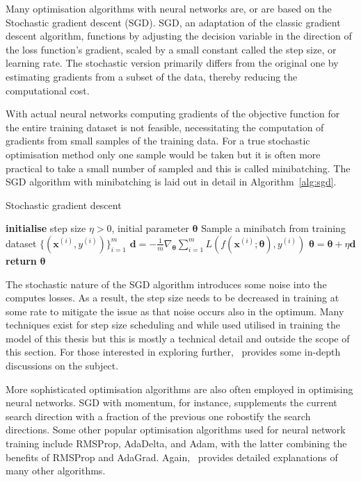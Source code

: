 Many optimisation algorithms with neural networks are, or are based on the Stochastic gradient descent (SGD).
SGD, an adaptation of the classic gradient descent algorithm, functions by adjusting the decision variable in the direction of the loss function's gradient, scaled by a small constant called the step size, or learning rate.
The stochastic version primarily differs from the original one by estimating gradients from a subset of the data, thereby reducing the computational cost.

With actual neural networks computing gradients of the objective function for the entire training dataset is not feasible, necessitating the computation of gradients from small samples of the training data.
For a true stochastic optimisation method only one sample would be taken but it is often more practical to take a small number of sampled and this is called minibatching.
The SGD algorithm with minibatching is laid out in detail in Algorithm~\ref{alg:sgd}.

\begin{algorithm}[H]
    \caption{Stochastic gradient descent}
    \label{alg:sgd}
    \begin{algorithmic}[1]
        \State\textbf{initialise} step size $\eta > 0$, initial parameter $\bm{\theta}$
         
        \State Sample a minibatch from training dataset $\{ (\bm{x}^{(i)}, y^{(i)}) \}_{i=1}^{m}$
        \State $\bm{d} = -\frac{1}{m} \nabla_{\bm{\theta}} \sum_{i=1}^{m} L(f(\bm{x}^{(i)}; \bm{\theta}), y^{(i)})$ 
        \State $\bm{\theta} = \bm{\theta} + \eta \bm{d}$ 
        \EndWhile
        \State\textbf{return} $\bm{\theta}$
    \end{algorithmic}
\end{algorithm}

The stochastic nature of the SGD algorithm introduces some noise into the computes losses.
As a result, the step size needs to be decreased in training at some rate to mitigate the issue as that noise occurs also in the optimum.
Many techniques exist for step size scheduling and while used utilised in training the model of this thesis but this is mostly a technical detail and outside the scope of this section.
For those interested in exploring further,~\cite{goodfellow} provides some in-depth discussions on the subject.

More sophisticated optimisation algorithms are also often employed in optimising neural networks.
SGD with momentum, for instance, supplements the current search direction with a fraction of the previous one robostify the search directions.
Some other popular optimisation algorithms used for neural network training include RMSProp, AdaDelta, and Adam, with the latter combining the benefits of RMSProp and AdaGrad.
Again,~\cite{goodfellow} provides detailed explanations of many other algorithms.

